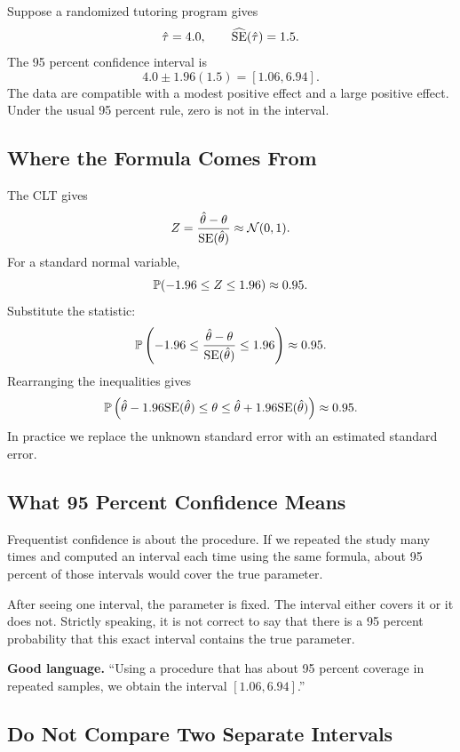 \begin{exmp}
Suppose a randomized tutoring program gives
\[
  \hat{\tau}=4.0,
  \qquad
  \widehat{\mathrm{SE}}(\hat{\tau})=1.5.
\]
The 95 percent confidence interval is
\[
  4.0 \pm 1.96(1.5)
  =
  [1.06,6.94].
\]
The data are compatible with a modest positive effect and a large positive
effect. Under the usual 95 percent rule, zero is not in the interval.
\end{exmp}

\subsection{Where the Formula Comes From}

The CLT gives
\[
  Z=
  \frac{\hat{\theta}-\theta}{\mathrm{SE}(\hat{\theta})}
  \approx \mathcal{N}(0,1).
\]
For a standard normal variable,
\[
  \mathbb{P}(-1.96 \leq Z \leq 1.96) \approx 0.95.
\]
Substitute the statistic:
\[
  \mathbb{P}\left(
    -1.96
    \leq
    \frac{\hat{\theta}-\theta}{\mathrm{SE}(\hat{\theta})}
    \leq
    1.96
  \right)
  \approx 0.95.
\]
Rearranging the inequalities gives
\[
  \mathbb{P}\left(
    \hat{\theta}-1.96\mathrm{SE}(\hat{\theta})
    \leq
    \theta
    \leq
    \hat{\theta}+1.96\mathrm{SE}(\hat{\theta})
  \right)
  \approx 0.95.
\]
In practice we replace the unknown standard error with an estimated standard
error.

\subsection{What 95 Percent Confidence Means}

Frequentist confidence is about the procedure. If we repeated the study many
times and computed an interval each time using the same formula, about 95
percent of those intervals would cover the true parameter.

After seeing one interval, the parameter is fixed. The interval either covers
it or it does not. Strictly speaking, it is not correct to say that there is a
95 percent probability that this exact interval contains the true parameter.

\begin{boxD}
\textbf{Good language.} ``Using a procedure that has about 95 percent
coverage in repeated samples, we obtain the interval $[1.06,6.94]$.''
\end{boxD}

\subsection{Do Not Compare Two Separate Intervals}

